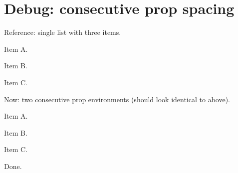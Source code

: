 \documentclass{article}
\begin{document}
\section{Debug: consecutive prop spacing}

Reference: single list with three items.

\begin{prop}
  \item Item A.
  \item Item B.
  \item Item C.
\end{prop}

Now: two consecutive prop environments (should look identical to above).

\begin{prop}
  \item Item A.
  \item Item B.
\end{prop}
\begin{prop}
  \item Item C.
\end{prop}

Done.
\end{document}
